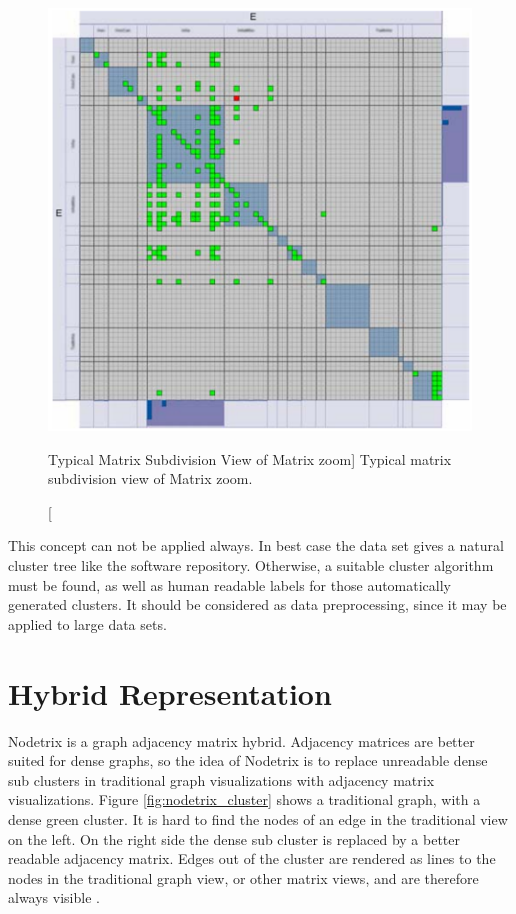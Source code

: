 \begin{figure}[h]
\centering
\includegraphics[width=\textwidth/2]{images/matrixzoom_cluster}
\caption
    [Typical Matrix Subdivision View of Matrix zoom]
    {Typical matrix subdivision view of Matrix zoom.}
    \label{fig:matrixzoom_cluster}
\end{figure}

This concept can not be applied always. In best case the data set gives a natural cluster tree like the software repository. Otherwise, a suitable cluster algorithm must be found, as well as human readable labels for those automatically generated clusters. It should be considered as data preprocessing, since it may be applied to large data sets.













\section{Hybrid Representation}
Nodetrix is a graph adjacency matrix hybrid. Adjacency matrices are better suited for dense graphs, so the idea of Nodetrix is to replace unreadable dense sub clusters in traditional graph visualizations with adjacency matrix visualizations. Figure \ref{fig:nodetrix_cluster} shows a traditional graph, with a dense green cluster. It is hard to find the nodes of an edge in the traditional view on the left. On the right side the dense sub cluster is replaced by a better readable  adjacency matrix. Edges out of the cluster are rendered as lines to the nodes in the traditional graph view, or other matrix views, and are therefore always visible \citep{henry-nodetrix-2007}.



